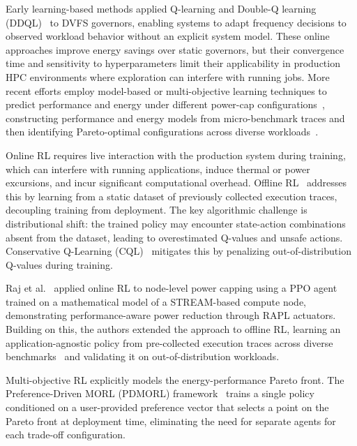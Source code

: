 Early learning-based methods applied Q-learning and Double-Q learning
(DDQL)~\cite{DDQL} to DVFS governors, enabling systems to adapt frequency
decisions to observed workload behavior without an explicit system model.
These online approaches improve energy savings over static governors, but their
convergence time and sensitivity to hyperparameters limit their applicability in
production HPC environments where exploration can interfere with running jobs.
More recent efforts employ model-based or multi-objective learning techniques to
predict performance and energy under different power-cap configurations~\cite{MOML},
constructing performance and energy models from micro-benchmark traces and then
identifying Pareto-optimal configurations across diverse
workloads~\cite{HPC_proxy_applications}.

Online RL requires live interaction with the production system during training,
which can interfere with running applications, induce thermal or power
excursions, and incur significant computational overhead.
Offline RL~\cite{levine2020offline} addresses this by learning from a static
dataset of previously collected execution traces, decoupling training from
deployment.  The key algorithmic challenge is distributional shift: the trained
policy may encounter state-action combinations absent from the dataset, leading
to overestimated Q-values and unsafe actions.  Conservative Q-Learning
(CQL)~\cite{levine2020offline} mitigates this by penalizing out-of-distribution
Q-values during training.

Raj et al.~\cite{ic2e23} applied online RL to node-level power capping using
a PPO agent trained on a mathematical model of a STREAM-based compute node,
demonstrating performance-aware power reduction through RAPL actuators.
Building on this, the authors extended the approach to offline RL, learning an
application-agnostic policy from pre-collected execution traces across diverse
benchmarks~\cite{offlineRL} and validating it on out-of-distribution workloads.

Multi-objective RL explicitly models the energy-performance Pareto front.
The Preference-Driven MORL (PDMORL) framework~\cite{basaklar2023pdmorlpreferencedrivenmultiobjectivereinforcement}
trains a single policy conditioned on a user-provided preference vector that
selects a point on the Pareto front at deployment time, eliminating the need
for separate agents for each trade-off configuration.

